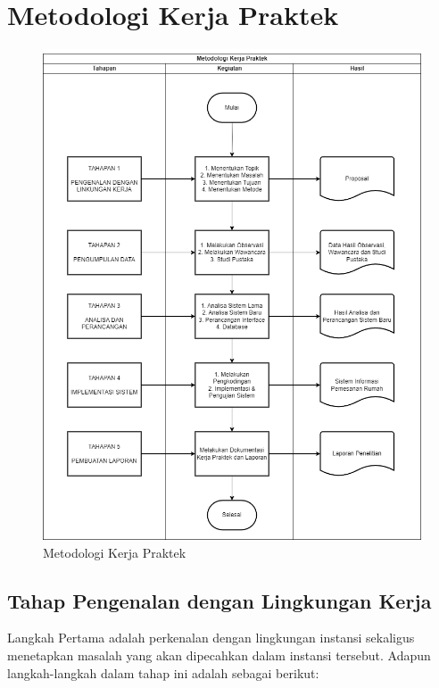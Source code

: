 \section{Metodologi Kerja Praktek}
\begin{figure}
    \centering
    \includegraphics[width=\textwidth]{Flowchart Metodologi Kerja Praktek.png}
    \caption{Metodologi Kerja Praktek}
    \label{fig:enter-label}
\end{figure}
\subsection{Tahap Pengenalan dengan Lingkungan Kerja}
\par Langkah Pertama adalah perkenalan dengan lingkungan instansi sekaligus menetapkan masalah yang akan dipecahkan dalam instansi tersebut. Adapun langkah-langkah dalam tahap ini adalah sebagai berikut:

